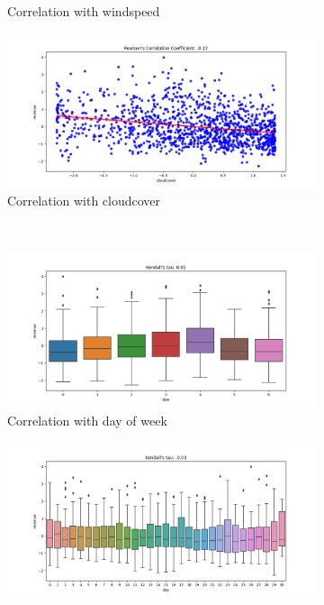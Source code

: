 \begin{figure}[h!]
\begin{subfigure}[b]{0.3\textwidth}
        \caption{Correlation with windspeed}
    \end{subfigure}
    \begin{subfigure}[b]{0.3\textwidth}
        \includegraphics[width=\textwidth]{../../preprocessing/plots/cloudcover.png}
        \caption{Correlation with cloudcover}
    \end{subfigure}
    ~ %
    \begin{subfigure}[b]{0.3\textwidth}
        \includegraphics[width=\textwidth]{../../preprocessing/plots/dow.png}
        \caption{Correlation with day of week}
    \end{subfigure}
    \begin{subfigure}[b]{0.3\textwidth}
        \includegraphics[width=\textwidth]{../../preprocessing/plots/day.png}

\end{subfigure}
\end{figure}
